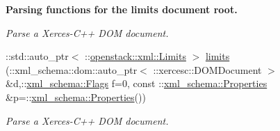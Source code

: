 \begin{Indent}{\bf Parsing functions for the limits document root.}
\begin{DoxyCompactItemize}
\begin{DoxyCompactList}\small\item\em Parse a Xerces-\/C++ DOM document. \item\end{DoxyCompactList}\item 
::std::auto\_\-ptr$<$ ::\hyperlink{classopenstack_1_1xml_1_1Limits}{openstack::xml::Limits} $>$ \hyperlink{namespaceopenstack_1_1xml_a346ce320541558140252928332e03ed1}{limits} (::xml\_\-schema::dom::auto\_\-ptr$<$ ::xercesc::DOMDocument $>$ \&d,::\hyperlink{namespacexml__schema_affb4c227cbd9aa7453dd1dc5a1401943}{xml\_\-schema::Flags} f=0, const ::\hyperlink{namespacexml__schema_ad27ce19a7ee1d3b1064092648898f64c}{xml\_\-schema::Properties} \&p=::\hyperlink{namespacexml__schema_ad27ce19a7ee1d3b1064092648898f64c}{xml\_\-schema::Properties}())
\begin{DoxyCompactList}\small\item\em Parse a Xerces-\/C++ DOM document. \item\end{DoxyCompactList}\end{DoxyCompactItemize}
\end{Indent}
